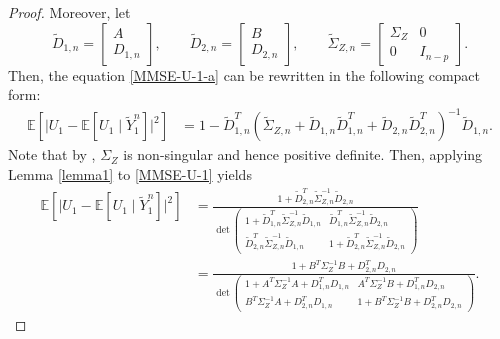 \documentclass[12pt]{article}
\newcommand{\E}{\mathbb{E}}
\begin{document}
\begin{proof}
Moreover, let 
\[
   \widetilde{D}_{1,n}=\begin{bmatrix}A \\[2pt]D_{1,n}\end{bmatrix}, \qquad\widetilde{D}_{2,n}=\begin{bmatrix}B\\[2pt]D_{2,n}\end{bmatrix},\qquad\widetilde{\Sigma}_{Z,n}=\begin{bmatrix}\Sigma_Z&0\\[2pt]0 &I_{n-p}\end{bmatrix}.
\]
Then, the equation \eqref{MMSE-U-1-a} can be rewritten in the following compact form: 
\begin{equation}\label{MMSE-U-1}
\begin{aligned}
   \E[\vert U_1-\E[U_1\mid \widetilde{Y}_1^n] \vert^2] &=1 - \widetilde{D}_{1,n}^T\left(\widetilde{\Sigma}_{Z,n} +\widetilde{D}_{1,n}\widetilde{D}_{1,n}^T +\widetilde{D}_{2,n}\widetilde{D}_{2,n}^T\right)^{-1}\widetilde{D}_{1,n}.
\end{aligned}
\end{equation}
Note that by \cite[Proposition 5.1.1]{brockwell2009time}, $\Sigma_Z$ is non-singular and hence positive definite. Then, applying Lemma \ref{lemma1} to \eqref{MMSE-U-1} yields 
\begin{equation}\label{MMSE-U-2}
\begin{aligned}
   \E[\vert U_1-\E[U_1\mid \widetilde{Y}_1^n]\vert^2]&=\frac{1+\widetilde{D}_{2,n}^T\widetilde{\Sigma}_{Z,n}^{-1}\widetilde{D}_{2,n}}{\det\begin{pmatrix}
      1+\widetilde{D}^T_{1,n}\widetilde{\Sigma}_{Z,n}^{-1}\widetilde{D}_{1,n} & \widetilde{D}^T_{1,n}\widetilde{\Sigma}_{Z,n}^{-1}\widetilde{D}_{2,n}\\[2pt]
      \widetilde{D}^T_{2,n}\widetilde{\Sigma}_{Z,n}^{-1}\widetilde{D}_{1,n} & 1+ \widetilde{D}^T_{2,n} \widetilde{\Sigma}_{Z,n}^{-1}\widetilde{D}_{2,n}
   \end{pmatrix}}\\
   &=\frac{1+ B^T\Sigma_Z^{-1}B +D_{2,n}^TD_{2,n}}{\det\begin{pmatrix}1+A^T\Sigma_Z^{-1}A +D^T_{1,n}D_{1,n} & A^T\Sigma_Z^{-1}B+D^T_{1,n}D_{2,n}\\[2pt]
      B^T\Sigma_Z^{-1}A+D^T_{2,n}D_{1,n} &1+B^T\Sigma_Z^{-1}B+D^T_{2,n}D_{2,n}
   \end{pmatrix}}.
\end{aligned}
\end{equation}

\end{proof}
\end{document}
